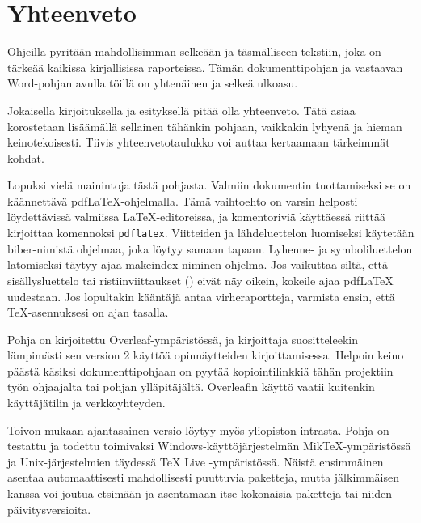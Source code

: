 \chapter{Yhteenveto}%
\label{ch:yhteenveto}

Ohjeilla pyritään mahdollisimman selkeään ja täsmälliseen tekstiin, joka on tärkeää kaikissa kirjallisissa raporteissa. Tämän dokumenttipohjan ja vastaavan Word-pohjan avulla töillä on yhtenäinen ja selkeä ulkoasu.

Jokaisella kirjoituksella ja esityksellä pitää olla yhteenveto. Tätä asiaa korostetaan lisäämällä sellainen tähänkin pohjaan, vaikkakin lyhyenä ja hieman keinotekoisesti. Tiivis yhteenvetotaulukko voi auttaa kertaamaan tärkeimmät kohdat.

Lopuksi vielä mainintoja tästä pohjasta. Valmiin dokumentin tuottamiseksi se on käännettävä pdf\LaTeX{}-ohjelmalla. Tämä vaihtoehto on varsin helposti löydettävissä valmiissa \LaTeX{}-editoreissa, ja komentoriviä käyttäessä riittää kirjoittaa komennoksi \texttt{pdflatex}. Viitteiden ja lähdeluettelon luomiseksi käytetään biber-nimistä ohjelmaa, joka löytyy samaan tapaan. Lyhenne- ja symboliluettelon latomiseksi täytyy ajaa makeindex-niminen ohjelma. Jos vaikuttaa siltä, että sisällysluettelo tai ristiinviittaukset () eivät näy oikein, kokeile ajaa pdf\LaTeX{} uudestaan. Jos lopultakin kääntäjä antaa virheraportteja, varmista ensin, että \TeX{}-asennuksesi on ajan tasalla.

Pohja on kirjoitettu Overleaf-ympäristössä, ja kirjoittaja suositteleekin lämpimästi sen version 2 käyttöä opinnäytteiden kirjoittamisessa. Helpoin keino päästä käsiksi dokumenttipohjaan on pyytää kopiointilinkkiä tähän projektiin työn ohjaajalta tai pohjan ylläpitäjältä. Overleafin käyttö vaatii kuitenkin käyttäjätilin ja verkkoyhteyden.

Toivon mukaan ajantasainen versio löytyy myös yliopiston intrasta. Pohja on testattu ja todettu toimivaksi Windows-käyttöjärjestelmän Mik\TeX-ympäristössä ja Unix-järjestelmien täydessä \TeX{} Live -ympäristössä. Näistä ensimmäinen asentaa automaattisesti mahdollisesti puuttuvia paketteja, mutta jälkimmäisen kanssa voi joutua etsimään ja asentamaan itse kokonaisia paketteja tai niiden päivitysversioita.
